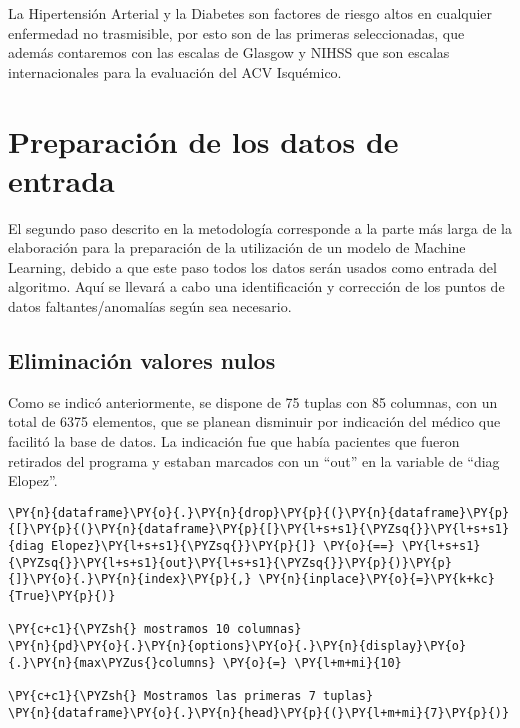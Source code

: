     La Hipertensión Arterial y la Diabetes son factores de riesgo altos en
cualquier enfermedad no trasmisible, por esto son de las primeras
seleccionadas, que además contaremos con las escalas de Glasgow y NIHSS
que son escalas internacionales para la evaluación del ACV Isquémico.

    \hypertarget{preparaciuxf3n-de-los-datos-de-entrada}{%
\section{Preparación de los datos de
entrada}\label{preparaciuxf3n-de-los-datos-de-entrada}}

El segundo paso descrito en la metodología corresponde a la parte más
larga de la elaboración para la preparación de la utilización de un
modelo de Machine Learning, debido a que este paso todos los datos serán
usados como entrada del algoritmo. Aquí se llevará a cabo una
identificación y corrección de los puntos de datos faltantes/anomalías
según sea necesario.

    \hypertarget{eliminaciuxf3n-las-filas-de-los-pacientes-que-se-expulsaron-de-la-bdd}{%
\subsection{Eliminación valores nulos}\label{eliminaciuxf3n-las-filas-de-los-pacientes-que-se-expulsaron-de-la-bdd}}

Como se indicó anteriormente, se dispone de 75 tuplas con 85 columnas,
con un total de 6375 elementos, que se planean disminuir por indicación
del médico que facilitó la base de datos. La indicación fue que había
pacientes que fueron retirados del programa y estaban marcados con un
``out'' en la variable de ``diag Elopez''.

    \begin{tcolorbox}[breakable, size=fbox, boxrule=1pt, pad at break*=1mm,colback=cellbackground, colframe=cellborder]
\begin{Verbatim}[commandchars=\\\{\}]
\PY{n}{dataframe}\PY{o}{.}\PY{n}{drop}\PY{p}{(}\PY{n}{dataframe}\PY{p}{[}\PY{p}{(}\PY{n}{dataframe}\PY{p}{[}\PY{l+s+s1}{\PYZsq{}}\PY{l+s+s1}{diag Elopez}\PY{l+s+s1}{\PYZsq{}}\PY{p}{]} \PY{o}{==} \PY{l+s+s1}{\PYZsq{}}\PY{l+s+s1}{out}\PY{l+s+s1}{\PYZsq{}}\PY{p}{)}\PY{p}{]}\PY{o}{.}\PY{n}{index}\PY{p}{,} \PY{n}{inplace}\PY{o}{=}\PY{k+kc}{True}\PY{p}{)}

\PY{c+c1}{\PYZsh{} mostramos 10 columnas}
\PY{n}{pd}\PY{o}{.}\PY{n}{options}\PY{o}{.}\PY{n}{display}\PY{o}{.}\PY{n}{max\PYZus{}columns} \PY{o}{=} \PY{l+m+mi}{10}

\PY{c+c1}{\PYZsh{} Mostramos las primeras 7 tuplas}
\PY{n}{dataframe}\PY{o}{.}\PY{n}{head}\PY{p}{(}\PY{l+m+mi}{7}\PY{p}{)}
\end{Verbatim}
\end{tcolorbox}

